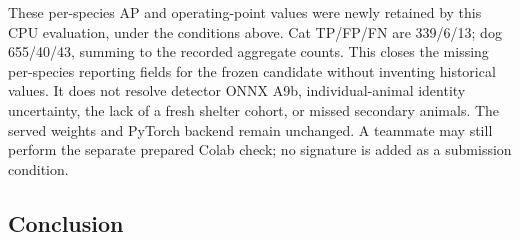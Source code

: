 \documentclass[11pt,a4paper]{article}
\begin{document}
These per-species AP and operating-point values were newly retained by this CPU evaluation, under the conditions above. Cat TP/FP/FN are 339/6/13; dog 655/40/43, summing to the recorded aggregate counts. This closes the missing per-species reporting fields for the frozen candidate without inventing historical values. It does not resolve detector ONNX A9b, individual-animal identity uncertainty, the lack of a fresh shelter cohort, or missed secondary animals. The served weights and PyTorch backend remain unchanged. A teammate may still perform the separate prepared Colab check; no signature is added as a submission condition.

\subsection{Conclusion}
\end{document}
